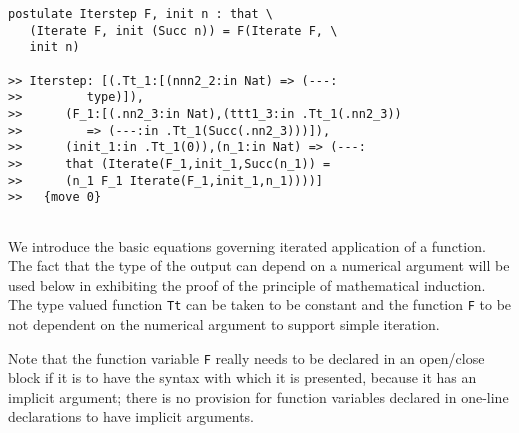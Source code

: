 \documentclass[12pt]{article}
\begin{document}
\begin{verbatim}
postulate Iterstep F, init n : that \
   (Iterate F, init (Succ n)) = F(Iterate F, \
   init n)

>> Iterstep: [(.Tt_1:[(nnn2_2:in Nat) => (---:
>>         type)]),
>>      (F_1:[(.nn2_3:in Nat),(ttt1_3:in .Tt_1(.nn2_3))
>>         => (---:in .Tt_1(Succ(.nn2_3)))]),
>>      (init_1:in .Tt_1(0)),(n_1:in Nat) => (---:
>>      that (Iterate(F_1,init_1,Succ(n_1)) =
>>      (n_1 F_1 Iterate(F_1,init_1,n_1))))]
>>   {move 0}


\end{verbatim}

We introduce the basic equations governing iterated application of a function.  The fact that the type of the output can depend on a numerical argument
will be used below in exhibiting the proof of the principle of mathematical induction.  The type valued function {\tt Tt} can be taken to be constant and
the function {\tt F} to be not dependent on the numerical argument to support simple iteration.

Note that the function variable {\tt F} really needs to be declared in an open/close block if it is to have the syntax with which it is presented, because it has an implicit argument; there is no provision for function variables
declared in one-line declarations to have implicit arguments.
\end{document}
